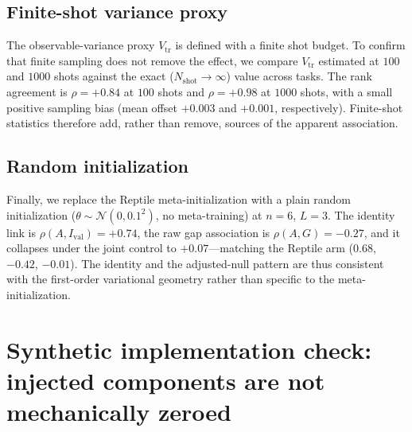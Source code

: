 \documentclass[aps,pra,onecolumn,superscriptaddress,10pt]{revtex4-2}
\newcommand{\Ival}{I_{\mathrm{val}}}
\newcommand{\Vtr}{V_{\mathrm{tr}}}
\begin{document}
\subsection{Finite-shot variance proxy}

The observable-variance proxy $\Vtr$ is defined with a finite shot budget. To confirm that finite
sampling does not remove the effect, we compare $\Vtr$ estimated at $100$ and $1000$ shots against
the exact ($N_{\mathrm{shot}}\!\to\!\infty$) value across tasks. The rank agreement is $\rho=+0.84$
at $100$ shots and $\rho=+0.98$ at $1000$ shots, with a small positive sampling bias (mean offset
$+0.003$ and $+0.001$, respectively). Finite-shot statistics therefore add, rather than remove,
sources of the apparent association.

\subsection{Random initialization}

Finally, we replace the Reptile meta-initialization with a plain random initialization
($\theta\sim\mathcal{N}(0,0.1^2)$, no meta-training) at $n=6$, $L=3$. The identity link is
$\rho(A,\Ival)=+0.74$, the raw gap association is $\rho(A,G)=-0.27$, and it collapses under the joint
control to $+0.07$---matching the Reptile arm ($0.68$, $-0.42$, $-0.01$). The identity and the
adjusted-null pattern are thus consistent with the first-order variational geometry rather than specific to the
meta-initialization.

\section{Synthetic implementation check: injected components are not mechanically zeroed}
\label{sm:positive}
\end{document}
